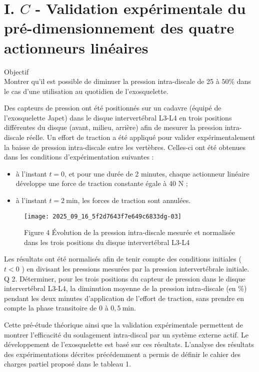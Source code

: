 \section{I. $C$ - Validation expérimentale du pré-dimensionnement des quatre actionneurs linéaires}
Objectif\\
Montrer qu'il est possible de diminuer la pression intra-discale de 25 à $50 \%$ dans le cas d'une utilisation au quotidien de l'exosquelette.

Des capteurs de pression ont été positionnés sur un cadavre (équipé de l'exosquelette Japet) dans le disque intervertébral L3-L4 en trois positions différentes du disque (avant, milieu, arrière) afin de mesurer la pression intra-discale réelle. Un effort de traction a été appliqué pour valider expérimentalement la baisse de pression intra-discale entre les vertèbres. Celles-ci ont été obtenues dans les conditions d'expérimentation suivantes :

\begin{itemize}
  \item à l'instant $t=0$, et pour une durée de 2 minutes, chaque actionneur linéaire développe une force de traction constante égale à 40 N ;
  \item à l'instant $t=2 \mathrm{~min}$, les forces de traction sont annulées.
\end{itemize}

\begin{figure}[h]
\begin{center}
  \texttt{[image: 2025\_09\_16\_5f2d7643f7e649c6833dg-03]}
\captionsetup{labelformat=empty}
\caption{Figure 4 Évolution de la pression intra-discale mesurée et normalisée dans les trois positions du disque intervertébral L3-L4}
\end{center}
\end{figure}

Les résultats ont été normalisés afin de tenir compte des conditions initiales ( $t<0$ ) en divisant les pressions mesurées par la pression intervertébrale initiale.\\
Q 2. Déterminer, pour les trois positions du capteur de pression dans le disque intervertébral L3-L4, la diminution moyenne de la pression intra-discale (en \%) pendant les deux minutes d'application de l'effort de traction, sans prendre en compte la phase transitoire de 0 à $0,5 \mathrm{~min}$.

Cette pré-étude théorique ainsi que la validation expérimentale permettent de montrer l'efficacité du soulagement intra-discal par un système externe actif. Le développement de l'exosquelette est basé sur ces résultats. L'analyse des résultats des expérimentations décrites précédemment a permis de définir le cahier des charges partiel proposé dans le tableau 1.

